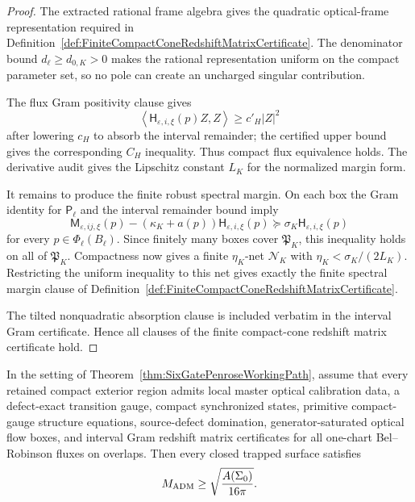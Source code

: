 \begin{proof}
The extracted rational frame algebra gives the quadratic optical-frame
representation required in Definition~\ref{def:FiniteCompactConeRedshiftMatrixCertificate}.
The denominator bound $d_\ell\ge d_{0,K}>0$ makes the rational representation
uniform on the compact parameter set, so no pole can create an uncharged
singular contribution.

The flux Gram positivity clause gives
\[
    \left\langle \mathsf H_{\varepsilon,i,\xi}(p)Z,Z\right\rangle
    \ge
    c'_H |Z|^2
\]
after lowering $c_H$ to absorb the interval remainder; the certified upper
bound gives the corresponding $C_H$ inequality.  Thus compact flux equivalence
holds.  The derivative audit gives the Lipschitz constant $L_K$ for the
normalized margin form.

It remains to produce the finite robust spectral margin.  On each box the Gram
identity for $\mathsf P_\ell$ and the interval remainder bound imply
\[
    \mathsf M_{\varepsilon,ij,\xi}(p)
    -
    (\kappa_K+a(p))\mathsf H_{\varepsilon,i,\xi}(p)
    \succeq
    \sigma_K\mathsf H_{\varepsilon,i,\xi}(p)
\]
for every $p\in\Phi_\ell(B_\ell)$.  Since finitely many boxes cover
$\mathfrak P_K$, this inequality holds on all of $\mathfrak P_K$.  Compactness
now gives a finite $\eta_K$-net $\mathcal N_K$ with
$\eta_K<\sigma_K/(2L_K)$.  Restricting the uniform inequality to this net gives
exactly the finite spectral margin clause of
Definition~\ref{def:FiniteCompactConeRedshiftMatrixCertificate}.

The tilted nonquadratic absorption clause is included verbatim in the interval
Gram certificate.  Hence all clauses of the finite compact-cone redshift matrix
certificate hold.
\end{proof}

\begin{corollary}\label{cor:IntervalGramLocalRoutePenrose}
In the setting of Theorem~\ref{thm:SixGatePenroseWorkingPath}, assume that every
retained compact exterior region admits local master optical calibration data, a
defect-exact transition gauge, compact synchronized states, primitive
compact-gauge structure equations, source-defect domination, generator-saturated
optical flow boxes, and interval Gram redshift matrix certificates for all
one-chart Bel--Robinson fluxes on overlaps. Then every closed trapped surface
satisfies
\[
    M_{\mathrm{ADM}}\ge \sqrt{\frac{A(\Sigma_0)}{16\pi}} .
\]
\end{corollary}

